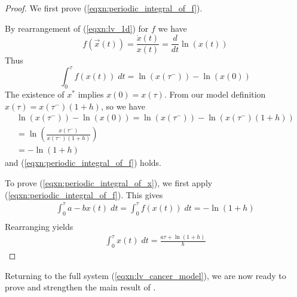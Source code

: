 \documentclass{article}
\theoremstyle{definition}
\begin{document}
\begin{proof}
    We first prove (\ref{eqxn:periodic_integral_of_f}).
    
    By rearrangement of (\ref{eqxn:lv_1d}) for $f$ we have
    \begin{equation*}
        f(\vec{x}(t)) = \frac{\dot{x}(t)}{x(t)} = \frac{d}{dt}\ln(x(t))
    \end{equation*}
    Thus
    \begin{equation*}
        \int_0^\tau f(x(t)) \; dt = \ln(x(\tau^-)) - \ln(x(0))
    \end{equation*}
    The existence of $x^*$ implies $x(0) = x(\tau)$. From our model definition $x(\tau)=x(\tau^-)(1+h)$, so we have
    \begin{equation*}
        \begin{split}
            \ln(x(\tau^-)) - \ln(x(0)) = \ln(x(\tau^-)) - \ln(x(\tau^-)(1+h))\\
            = \ln{\left(\frac{x(\tau^-)}{x(\tau^-)(1+h)}\right)} \\
            = - \ln{(1 + h)}
        \end{split}
    \end{equation*}
    and (\ref{eqxn:periodic_integral_of_f}) holds.

    To prove (\ref{eqxn:periodic_integral_of_x}), we first apply (\ref{eqxn:periodic_integral_of_f}). This gives
    \begin{equation*}
        \begin{split}
           \int_0^\tau a - bx(t) \; dt = \int_0^\tau f(x(t)) \; dt = 
             -\ln{(1+h)}\\
        \end{split}
    \end{equation*}
    Rearranging yields
    \begin{equation*}
        \begin{split}
            \int_0^\tau x(t) \; dt = \frac{a\tau  + \ln{(1+h)}}{b} 
        \end{split}
    \end{equation*}
    
\end{proof}

Returning to the full system (\ref{eqxn:lv_cancer_model}), we are now ready to prove and strengthen the main result of \cite{jin_persistence_2005}.
\end{document}
